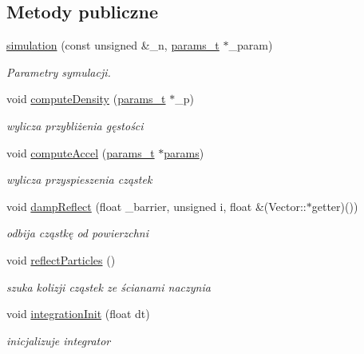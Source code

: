 \subsection*{Metody publiczne}
\begin{DoxyCompactItemize}
\item 
\hyperlink{classsimulation_a30fdcc611ae9a656a3aebb8445e4607d}{simulation} (const unsigned \&\+\_\+n, \hyperlink{structparams__t}{params\+\_\+t} $\ast$\+\_\+param)
\begin{DoxyCompactList}\small\item\em Parametry symulacji. \end{DoxyCompactList}\item 
void \hyperlink{classsimulation_a7679fcd9a25d6cb5597338d054a30684}{compute\+Density} (\hyperlink{structparams__t}{params\+\_\+t} $\ast$\+\_\+p)
\begin{DoxyCompactList}\small\item\em wylicza przybliżenia gęstości \end{DoxyCompactList}\item 
void \hyperlink{classsimulation_a16b945b81e27680a709fffd8663bf856}{compute\+Accel} (\hyperlink{structparams__t}{params\+\_\+t} $\ast$\hyperlink{classsimulation_a861b82cc3c0e7e58abfba464a133dae3}{params})
\begin{DoxyCompactList}\small\item\em wylicza przyspieszenia cząstek \end{DoxyCompactList}\item 
void \hyperlink{classsimulation_a353d4dd3a66197360e882bc29a6fef0b}{damp\+Reflect} (float \+\_\+barrier, unsigned i, float \&(Vector\+::$\ast$getter)())
\begin{DoxyCompactList}\small\item\em odbija cząstkę od powierzchni \end{DoxyCompactList}\item 
void \hyperlink{classsimulation_a9cb3fe3f985ceb039736a666923a20b5}{reflect\+Particles} ()
\begin{DoxyCompactList}\small\item\em szuka kolizji cząstek ze ścianami naczynia \end{DoxyCompactList}\item 
void \hyperlink{classsimulation_a300e67649652f2ae9337af3d5244e0f7}{integration\+Init} (float dt)
\begin{DoxyCompactList}\small\item\em inicjalizuje integrator \end{DoxyCompactList}\item 

\end{DoxyCompactItemize}

